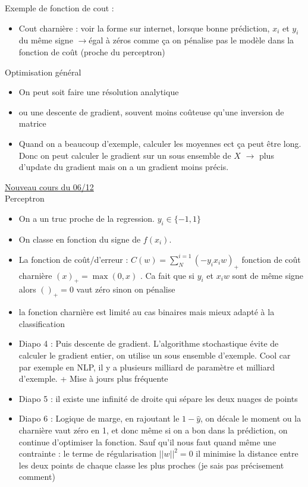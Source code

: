 \documentclass{article}
\theoremstyle{plain}%
\theoremstyle{definition}
\theoremstyle{remark}
\begin{document}
Exemple de fonction de cout :
\begin{itemize}
    \item Cout charnière : voir la forme sur internet, lorsque bonne prédiction, $x_i$ et $y_i$ du même signe $\rightarrow$égal à zéros comme ça on pénalise pas le modèle dans la fonction de coût (proche du perceptron)
\end{itemize}
Optimisation général 
\begin{itemize}
    \item On peut soit faire une résolution analytique
    \item ou une descente de gradient, souvent moins coûteuse qu'une inversion de matrice 
    \item Quand on a beaucoup d'exemple, calculer les moyennes ect ça peut être long. Donc on peut calculer le gradient sur un sous ensemble de $ X $ $\rightarrow$ plus d'update du gradient mais on a un gradient moins précis.
\end{itemize}


\underline{Nouveau cours du 06/12} \\
Perceptron
\begin{itemize}
    \item On a un truc proche de la regression. $ y_i \in \{-1, 1\} $ 
    \item On classe en fonction du signe de $ f(x_i) $. 
    \item La fonction de coût/d'erreur : $ C(w) = \sum_{N}^{i=1}(-y_i x_i w)_+ $ fonction de coût charnière $ (x)_+ = \max (0, x)$ . Ca fait que si $ y_i $ et $ x_i w $ sont de même signe alors $ ()_+ = 0$ vaut zéro sinon on pénalise 
    \item la fonction charnière est limité au cas binaires mais mieux adapté à la classification 
    \item Diapo 4 : Puis descente de gradient. L'algorithme stochastique évite de calculer le gradient entier, on utilise un sous ensemble d'exemple. Cool car par exemple en NLP, il y a plusieurs milliard de paramètre et milliard d'exemple. + Mise à jours plus fréquente
    \item Diapo 5 : il existe une infinité de droite qui sépare les deux nuages de points
    \item Diapo 6 : Logique de marge, en rajoutant le $ 1 - \hat{y} $, on décale le moment ou la charnière vaut zéro en 1, et donc même si on a bon dans la prédiction, on continue d'optimiser la fonction. Sauf qu'il nous faut quand même une contrainte : le terme de régularisation $ ||w||^2 = 0 $ il minimise la distance entre les deux points de chaque classe les plus proches (je sais pas précisement comment)
\end{itemize}
\end{document}
